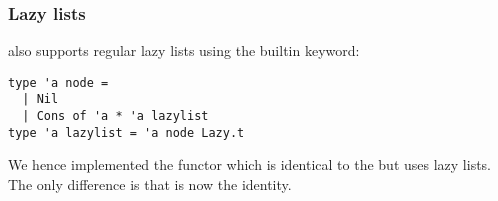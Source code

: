\subsubsection{Lazy lists}

\ocaml also supports regular lazy lists using the builtin  keyword:

\begin{lstlisting}
type 'a node =
  | Nil
  | Cons of 'a * 'a lazylist
type 'a lazylist = 'a node Lazy.t
\end{lstlisting}

We hence implemented the  functor which is identical to the
 but uses lazy lists. The only difference is that
 is now the identity.





